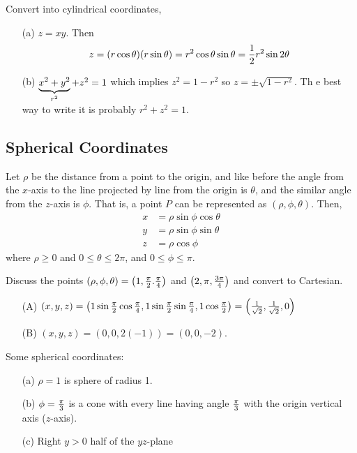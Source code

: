 \documentclass[english, 11pt]{article}
\begin{document}
\begin{exmp}
  Convert into cylindrical coordinates,
  \begin{itemize}
    \item[(a)] $z = xy$. Then
    \[ z = (r\cos \theta)(r\sin \theta) = r^2 \cos \theta \sin \theta = \frac{1}{2}r^2 \sin 2\theta \]
    \item[(b)] $\underbrace{x^2 + y^2}_{r^2} + z^2 = 1$ which implies $z^2 = 1-r^2$ so $z = \pm \sqrt{1 -r^2}$. Th e best way to write it is probably $r^2 + z^2 = 1$.
  \end{itemize}
\end{exmp}

\subsection{Spherical Coordinates}

Let $\rho$ be the distance from a point to the origin, and like before the angle from the $x$-axis to the line projected by line from the origin is $\theta$, and the similar angle from the $z$-axis is $\phi$. That is, a point $P$ can be represented as $(\rho, \phi, \theta)$. Then,
\begin{align*}
  x&= \rho \sin \phi \cos \theta \\
  y & = \rho \sin \phi \sin \theta \\
  z & = \rho \cos \phi
\end{align*}
where $\rho \geq 0$ and $0 \leq \theta \leq 2 \pi$, and $0 \leq \phi \leq \pi$.

\begin{exmp}
  Discuss the points $(\rho, \phi, \theta) = \left( 1, \frac{\pi}{2}. \frac{\pi}{4} \right)$ and $\left( 2 , \pi, \frac{3\pi}{4} \right)$ and convert to Cartesian.
  \begin{itemize}
    \item[(A)] $(x,y,z) = \left( 1\sin\frac{\pi}{2}\cos\frac{\pi}{4} ,1\sin\frac{\pi}{2}\sin\frac{\pi}{4} ,1\cos\frac{\pi}{2} \right) = \left( \frac{1}{\sqrt{2}}, \frac{1}{\sqrt{2}}, 0 \right)$
    \item[(B)] $(x,y,z) = (0,0,2(-1)) = (0,0,-2)$.
  \end{itemize}
\end{exmp}
\begin{exmp}
  Some spherical coordinates:
  \begin{itemize}
    \item[(a)] $\rho = 1$ is sphere of radius 1.
    \item[(b)] $\phi = \frac{\pi}{3}$ is a cone with every line having angle $\frac{\pi}{3}$ with the origin vertical axis ($z$-axis).
    \item[(c)] Right $y>0$ half of the $yz$-plane
  \end{itemize}
\end{exmp}
\end{document}
